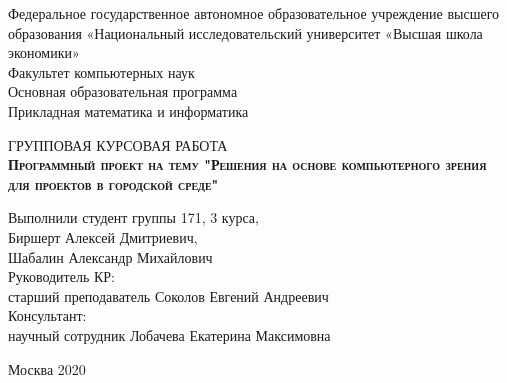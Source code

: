 \begin{titlepage}
    \newpage

    {
    \begin{center}
        Федеральное государственное автономное образовательное учреждение высшего образования «Национальный исследовательский университет «Высшая школа экономики»
        \\
        \bigskip
        Факультет компьютерных наук \\
        Основная образовательная программа \\
        Прикладная математика и информатика \\
    \end{center}
    }

    \vspace{8em}

    \begin{center}
    {\Large ГРУППОВАЯ КУРСОВАЯ РАБОТА}
        \\
        \textsc{\textbf{
        Программный проект на тему
        \linebreak
        "Решения на основе компьютерного зрения для проектов в городской среде"}}
    \end{center}

    \vspace{2em}

    {
    \hfill\parbox{16cm}{
    \hspace*{5cm}\hspace*{-5cm}Выполнили студент группы 171, 3 курса,\\
    Биршерт Алексей Дмитриевич,\\
    Шабалин Александр Михайлович\\

    \hspace*{5cm}\hspace*{-5cm}Руководитель КР:\\
    старший преподаватель Соколов Евгений Андреевич
    \\


    \hspace*{5cm}\hspace*{-5cm}Консультант:\\
    научный сотрудник Лобачева Екатерина Максимовна\\
    }
    }

    \vspace{\fill}

    \begin{center}
        Москва 2020
    \end{center}

\end{titlepage}